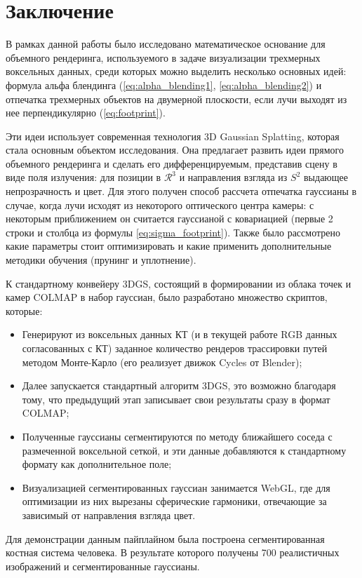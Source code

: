 \section*{Заключение}

В рамках данной работы было исследовано математическое основание для объемного рендеринга, используемого в задаче визуализации трехмерных воксельных данных, среди которых можно выделить несколько основных идей: формула альфа блендинга (\ref{eq:alpha_blending1}, \ref{eq:alpha_blending2}) и отпечатка трехмерных объектов на двумерной плоскости, если лучи выходят из нее перпендикулярно (\ref{eq:footprint}).

Эти идеи использует современная технология 3D Gaussian Splatting, которая стала основным объектом исследования. Она предлагает развить идеи прямого объемного рендеринга и сделать его дифференцируемым, представив сцену в виде поля излучения: для позиции в $\mathcal R^3$ и направления взгляда из $S^2$ выдающее непрозрачность и цвет. Для этого получен способ рассчета отпечатка гауссианы в случае, когда лучи исходят из некоторого оптического центра камеры: с некоторым приближением он считается гауссианой с ковариацией (первые 2 строки и столбца из формулы \ref{eq:sigma_footprint}). Также было рассмотрено какие параметры стоит оптимизировать и какие применить дополнительные методики обучения (прунинг и уплотнение).

К стандартному конвейеру 3DGS, состоящий в формировании из облака точек и камер COLMAP в набор гауссиан, было разработано множество скриптов, которые:
%
\begin{itemize}
	\item Генерируют из воксельных данных КТ (и в текущей работе RGB данных согласованных с КТ) заданное количество рендеров трассировки путей методом Монте-Карло (его реализует движок Cycles от Blender);
	\item Далее запускается стандартный алгоритм 3DGS, это возможно благодаря тому, что предыдущий этап записывает свои результаты сразу в формат COLMAP;
	\item Полученные гауссианы сегментируются по методу ближайшего соседа с размеченной воксельной сеткой, и эти данные добавляются к стандартному формату как дополнительное поле;
	\item Визуализацией сегментированных гауссиан занимается WebGL, где для оптимизации из них вырезаны сферические гармоники, отвечающие за зависимый от направления взгляда цвет.
\end{itemize}
%
Для демонстрации данным пайплайном была построена сегментированная костная система человека. В результате которого получены 700 реалистичных изображений и сегментированные гауссианы.

